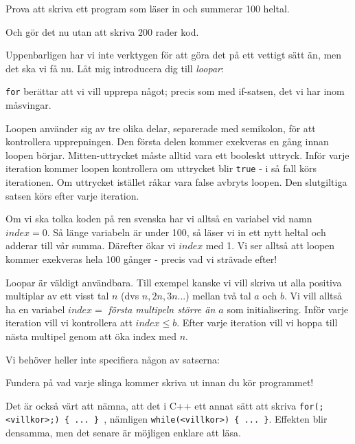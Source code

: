Prova att skriva ett program som läser in och summerar 100 heltal.

Och gör det nu utan att skriva 200 rader kod.

Uppenbarligen har vi inte verktygen för att göra det på ett vettigt sätt än, men det ska vi få nu. Låt mig introducera dig till \emph{loopar}:



\texttt{for} berättar att vi vill upprepa något; precis som med if-satsen, det vi har inom måsvingar. 

Loopen använder sig av tre olika delar, separerade med semikolon, för att kontrollera upprepningen. Den första delen kommer exekveras en gång innan loopen börjar. Mitten-uttrycket måste alltid vara ett booleskt uttryck. Inför varje iteration kommer loopen kontrollera om uttrycket blir \texttt{true} - i så fall körs iterationen. Om uttrycket istället råkar vara false avbryts loopen. Den slutgiltiga satsen körs efter varje iteration.

Om vi ska tolka koden på ren svenska har vi alltså en variabel vid namn $index = 0$. Så länge variabeln är under 100, så läser vi in ett nytt heltal och adderar till vår summa. Därefter ökar vi $index$ med 1. Vi ser alltså att loopen kommer exekveras hela 100 gånger - precis vad vi strävade efter!

Loopar är väldigt användbara. Till exempel kanske vi vill skriva ut alla positiva multiplar av ett visst tal $n$ (dvs $n, 2n, 3n...$) mellan två tal $a$ och $b$. Vi vill alltså ha en variabel $index = $ \emph{första multipeln större än $a$} som initialisering. Inför varje iteration vill vi kontrollera att $index \le b$. Efter varje iteration vill vi hoppa till nästa multipel genom att öka index med $n$.



Vi behöver heller inte specifiera någon av satserna:



Fundera på vad varje slinga kommer skriva ut innan du kör programmet!

Det är också värt att nämna, att det i C++ ett annat sätt att skriva \texttt{for(;<villkor>;) \{ ... \} }, nämligen \texttt{while(<villkor>) \{ ... \}}. Effekten blir densamma, men det senare är möjligen enklare att läsa.